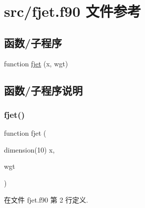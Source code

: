 \hypertarget{fjet_8f90}{}\section{src/fjet.f90 文件参考}
\label{fjet_8f90}
\subsection*{函数/子程序}
\begin{DoxyCompactItemize}
\item 
function \mbox{\hyperlink{fjet_8f90_a3009cc3da417da6b30f45aa860cd53dd}{fjet}} (x, wgt)
\end{DoxyCompactItemize}


\subsection{函数/子程序说明}
\mbox{\label{fjet_8f90_a3009cc3da417da6b30f45aa860cd53dd}} 
\subsubsection{\texorpdfstring{fjet()}{fjet()}}
{\footnotesize\ttfamily function fjet (\begin{DoxyParamCaption}\item[{dimension(10)}]{x,  }\item[{}]{wgt }\end{DoxyParamCaption})}



在文件 fjet.\+f90 第 2 行定义.

